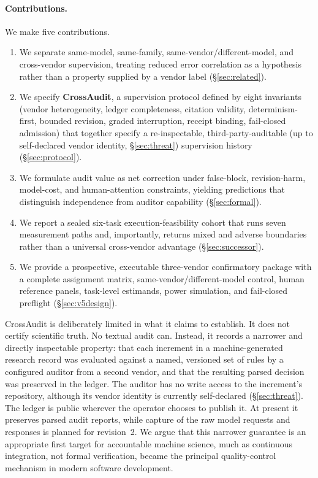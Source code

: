 \documentclass[11pt,letterpaper]{article}
\begin{document}
\paragraph{Contributions.} We make five contributions.
\begin{enumerate}[itemsep=1pt,topsep=3pt]
  \item We separate same-model, same-family, same-vendor/different-model, and cross-vendor supervision, treating reduced error correlation as a hypothesis rather than a property supplied by a vendor label (\S\ref{sec:related}).
  \item We specify \textbf{CrossAudit}, a supervision protocol defined by eight invariants (vendor heterogeneity, ledger completeness, citation validity, determinism-first, bounded revision, graded interruption, receipt binding, fail-closed admission) that together specify a re-inspectable, third-party-auditable (up to self-declared vendor identity, \S\ref{sec:threat}) supervision history (\S\ref{sec:protocol}).
  \item We formulate audit value as net correction under false-block, revision-harm, model-cost, and human-attention constraints, yielding predictions that distinguish independence from auditor capability (\S\ref{sec:formal}).
  \item We report a sealed six-task execution-feasibility cohort that runs seven measurement paths and, importantly, returns mixed and adverse boundaries rather than a universal cross-vendor advantage (\S\ref{sec:successor}).
  \item We provide a prospective, executable three-vendor confirmatory package with a complete assignment matrix, same-vendor/different-model control, human reference panels, task-level estimands, power simulation, and fail-closed preflight (\S\ref{sec:v5design}).
\end{enumerate}

CrossAudit is deliberately limited in what it claims to establish. It does not certify scientific truth. No textual audit can. Instead, it records a narrower and directly inspectable property: that each increment in a machine-generated research record was evaluated against a named, versioned set of rules by a configured auditor from a second vendor, and that the resulting parsed decision was preserved in the ledger. The auditor has no write access to the increment's repository, although its vendor identity is currently self-declared (\S\ref{sec:threat}). The ledger is public wherever the operator chooses to publish it. At present it preserves parsed audit reports, while capture of the raw model requests and responses is planned for revision~2. We argue that this narrower guarantee is an appropriate first target for accountable machine science, much as continuous integration, not formal verification, became the principal quality-control mechanism in modern software development.
\end{document}
